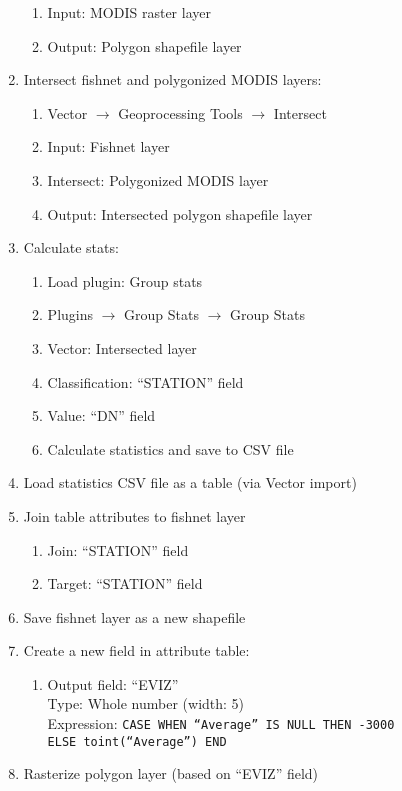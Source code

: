 \begin{enumerate}
\begin{enumerate}
        \item Input: MODIS raster layer
        \item Output: Polygon shapefile layer
    \end{enumerate}
    \item Intersect fishnet and polygonized MODIS layers:
    \begin{enumerate}
        \item Vector $\rightarrow$ Geoprocessing Tools $\rightarrow$ Intersect
        \item Input: Fishnet layer
        \item Intersect: Polygonized MODIS layer
        \item Output: Intersected polygon shapefile layer
    \end{enumerate}
    \item Calculate stats:
    \begin{enumerate}
        \item Load plugin: Group stats
        \item Plugins $\rightarrow$ Group Stats $\rightarrow$ Group Stats
        \item Vector: Intersected layer
        \item Classification: ``STATION'' field
        \item Value: ``DN'' field
        \item Calculate statistics and save to CSV file
    \end{enumerate}
    \item Load statistics CSV file as a table (via Vector import)
    \item Join table attributes to fishnet layer
    \begin{enumerate}
        \item Join: ``STATION'' field
        \item Target: ``STATION'' field
    \end{enumerate}
    \item Save fishnet layer as a new shapefile
    \item Create a new field in attribute table:
    \begin{enumerate}
        \item Output field: ``EVIZ''\\
              Type: Whole number (width: 5)\\
              Expression: \texttt{CASE WHEN ``Average'' IS NULL THEN -3000 \\
              ELSE toint(``Average'') END}
    \end{enumerate}
    \item Rasterize polygon layer (based on ``EVIZ'' field)
\end{enumerate}

